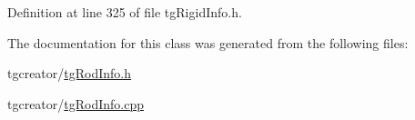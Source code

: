 Definition at line 325 of file tg\-Rigid\-Info.\-h.



The documentation for this class was generated from the following files\-:\begin{DoxyCompactItemize}
\item 
tgcreator/\hyperlink{tg_rod_info_8h}{tg\-Rod\-Info.\-h}\item 
tgcreator/\hyperlink{tg_rod_info_8cpp}{tg\-Rod\-Info.\-cpp}\end{DoxyCompactItemize}
